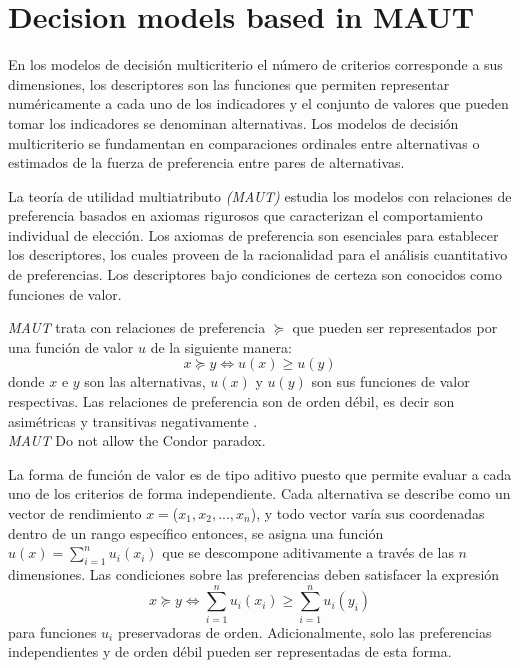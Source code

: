 \section{Decision models based in MAUT}


En los modelos de decisión multicriterio el número de criterios corresponde a sus dimensiones,
los descriptores son las funciones que permiten representar numéricamente a cada uno de los
indicadores y el conjunto de valores que pueden tomar los indicadores se denominan alternativas. Los
modelos de decisión multicriterio se fundamentan en comparaciones ordinales entre alternativas o
estimados de la fuerza de preferencia entre pares de alternativas\citep{3}.

La teoría de utilidad multiatributo \textit{(MAUT)} estudia los modelos con relaciones de
preferencia basados en axiomas rigurosos que caracterizan el comportamiento individual de elección.
Los axiomas de preferencia son esenciales para establecer los descriptores, los cuales proveen de la
racionalidad para el análisis cuantitativo de preferencias. Los descriptores bajo condiciones de
certeza son conocidos como funciones de valor.

\textit{MAUT} trata con relaciones de preferencia $\succeq$ que pueden ser representados por
una función de valor $u$ de la siguiente manera:
\[x\succeq y \Leftrightarrow u(x)\geq u(y)\]
donde $x$ e $y$ son las alternativas, $u(x)$ y $u(y)$ son sus funciones de valor respectivas. 
Las relaciones de preferencia son de orden débil, es decir son asimétricas y
transitivas negativamente \citep{3}.\\

\textit{MAUT} Do not allow the Condor paradox.


La forma de función de valor es de tipo aditivo puesto que permite evaluar a cada uno de
los criterios de forma independiente. Cada alternativa se describe como un vector de rendimiento
$x=$($x_{1}, x_{2},..., x_{n}$), y todo vector varía sus coordenadas dentro de un rango específico
entonces, se asigna una función $u(x)=\sum\limits_{i=1}^{n}u_i(x_i)$ que se descompone aditivamente
a través de las $n$ dimensiones. Las condiciones sobre las preferencias deben satisfacer la
expresión
\[x\succeq y \Leftrightarrow \sum\limits_{i=1}^{n}u_i(x_i)\geq \sum\limits_{i=1}^{n}u_i(y_i)\]
para funciones $u_i$ preservadoras de orden\citep{3}. Adicionalmente, solo las
preferencias independientes y de orden débil pueden ser representadas de esta forma\citep{2}.

